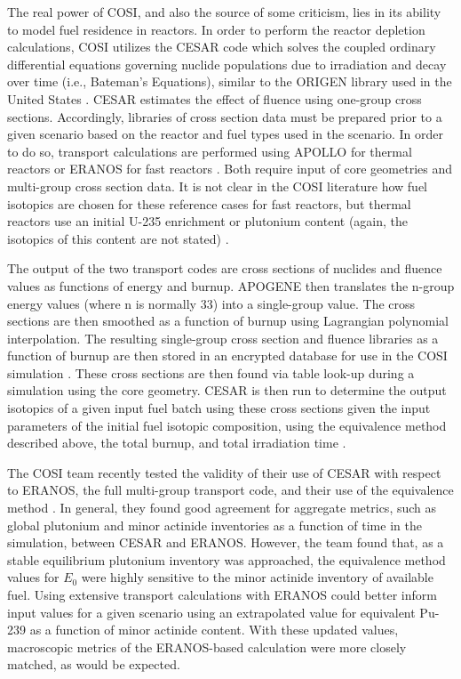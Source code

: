 The real power of COSI, and also the source of some criticism, lies in its
ability to model fuel residence in reactors. In order to perform the reactor
depletion calculations, COSI utilizes the CESAR code \cite{vidal_cesar:_2006}
which solves the coupled ordinary differential equations governing nuclide
populations due to irradiation and decay over time (i.e., Bateman's Equations),
similar to the ORIGEN library used in the United
States \cite{bell_origen_1973}. CESAR estimates the effect of fluence using
one-group cross sections. Accordingly, libraries of cross section data must be
prepared prior to a given scenario based on the reactor and fuel types used in
the scenario. In order to do so, transport calculations are performed using
APOLLO \cite{santamarina_2009_apollo2} for thermal reactors or ERANOS for fast
reactors \cite{ruggieri_2006_eranos}. Both require input of core geometries and
multi-group cross section data. It is not clear in the COSI literature how fuel
isotopics are chosen for these reference cases for fast reactors, but thermal
reactors use an initial U-235 enrichment or plutonium content (again, the
isotopics of this content are not stated) \cite{guerin_benchmark_2009}.

The output of the two transport codes are cross sections of nuclides and fluence
values as functions of energy and burnup. APOGENE then translates the n-group
energy values (where n is normally 33) into a single-group value. The cross
sections are then smoothed as a function of burnup using Lagrangian polynomial
interpolation. The resulting single-group cross section and fluence libraries as
a function of burnup are then stored in an encrypted database for use in the
COSI simulation \cite{atabekjana_2012_analysis}. These cross sections are then
found via table look-up during a simulation using the core geometry. CESAR is
then run to determine the output isotopics of a given input fuel batch using
these cross sections given the input parameters of the initial fuel isotopic
composition, using the equivalence method described above, the total burnup, and
total irradiation time \cite{coquelet-pascal_validation_2011}.

The COSI team recently tested the validity of their use of CESAR with respect to
ERANOS, the full multi-group transport code, and their use of the equivalence
method \cite{coquelet-pascal_validation_2011}. In general, they found good
agreement for aggregate metrics, such as global plutonium and minor actinide
inventories as a function of time in the simulation, between CESAR and
ERANOS. However, the team found that, as a stable equilibrium plutonium
inventory was approached, the equivalence method values for $E_0$ were highly
sensitive to the minor actinide inventory of available fuel. Using extensive
transport calculations with ERANOS could better inform input values for a given
scenario using an extrapolated value for equivalent Pu-239 as a function of
minor actinide content. With these updated values, macroscopic metrics of the
ERANOS-based calculation were more closely matched, as would be expected.
